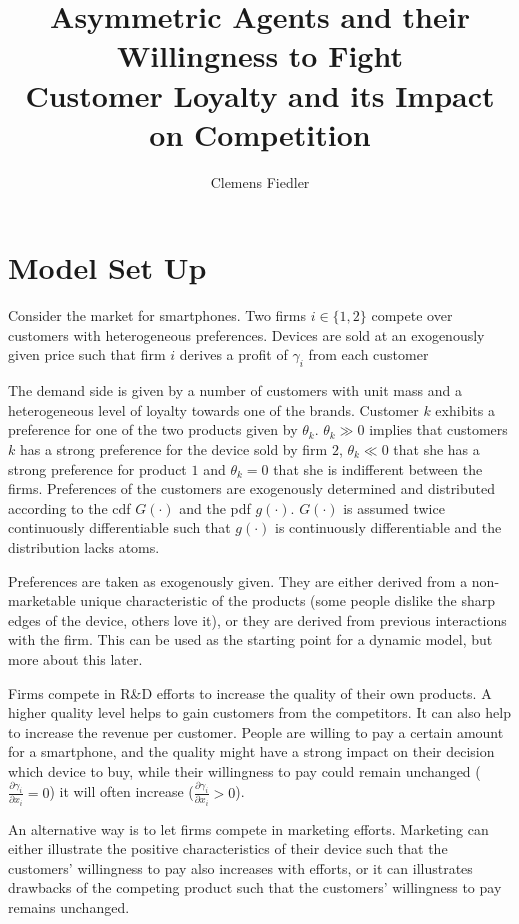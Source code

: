 \documentclass[a4paper, 11pt]{article}
\author{Clemens Fiedler}
\title{Asymmetric Agents and their Willingness to Fight\\
	{\Large Customer Loyalty and its Impact on Competition}}
\begin{document}
	
\maketitle

\section{Model Set Up}
Consider the market for smartphones. Two firms $i\in\{1,2\}$ compete over customers with heterogeneous preferences. Devices are sold at an exogenously given price such that firm $i$ derives a profit of $\gamma_i$ from each customer
 
The demand side is given by a number of customers with unit mass and a heterogeneous level of loyalty towards one of the brands. Customer $k$ exhibits a preference for one of the two products given by $\theta_k$. $\theta_k\gg0$ implies that customers $k$ has a strong preference for the device sold by firm $2$, $\theta_k\ll0$ that she has a strong preference for product $1$ and $\theta_k= 0$ that she is indifferent between the firms. Preferences of the customers are exogenously determined and distributed according to the cdf $G(\cdot)$ and the pdf $g(\cdot)$. $G(\cdot)$ is assumed twice continuously differentiable such that $g(\cdot)$ is continuously differentiable and the distribution lacks atoms. 

Preferences are taken as exogenously given. They are either derived from a non-marketable unique characteristic of the products (some people dislike the sharp edges of the device, others love it), or they are derived from previous interactions with the firm. This can be used as the starting point for a dynamic model, but more about this later.

Firms compete in R\&D efforts to increase the quality of their own products. A higher quality level helps to gain customers from the competitors. It can also help to increase the revenue per customer. People are willing to pay a certain amount for a smartphone, and the quality might have a strong impact on their decision which device to buy, while their willingness to pay could remain unchanged ($\frac{\partial \gamma_i}{\partial x_i}=0$) it will often increase ($\frac{\partial \gamma_i}{\partial x_i}>0$).

An alternative way is to let firms compete in marketing efforts. Marketing can either illustrate the positive characteristics of their device such that the customers' willingness to pay also increases with efforts, or it can illustrates drawbacks of the competing product such that the customers' willingness to pay remains unchanged.
\end{document}
